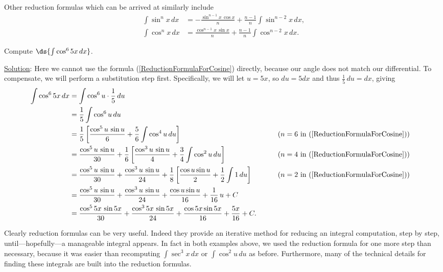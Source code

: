 Other reduction formulas which can be arrived at similarly
include
\begin{align}
\int\sin^nx\,dx&=-\frac{\sin^{n-1}x\,\cos x}{n}
       +\frac{n-1}n\int\sin^{n-2}x\,dx,
        \label{ReductionFormulaForSine}\\
\int\cos^nx\,dx&=\frac{\cos^{n-1}x\,\sin x}{n}
       +\frac{n-1}n\int\cos^{n-2}x\,dx.
        \label{ReductionFormulaForCosine}
\end{align}

\bex Compute $\ds{\int\cos^65x\,dx}$.

\underline{Solution}: Here we cannot use the formula
(\ref{ReductionFormulaForCosine}) directly, because our angle does
not match our differential.  To compensate, we will
perform a substitution step first.  Specifically, we will
let $u=5x$, so $du=5dx$ and thus $\frac15\,du=dx$, giving
\begin{alignat*}{2}
\int\cos^65x\,dx&=\int\cos^6u\cdot\frac15\,du\\
&=\frac15\int\cos^6u\,du\\
&=\frac15\left[\frac{\cos^5u\,\sin u}6+\frac56\int\cos^4u\,du\right]
        &\qquad&\text{($n=6$ in (\ref{ReductionFormulaForCosine}))}\\
&=\frac{\cos^5u\,\sin u}{30}+\frac16\left[\frac{\cos^3u\,\sin u}{4}
           +\frac34\int\cos^2u\,du\right]
          &&\text{($n=4$ in (\ref{ReductionFormulaForCosine}))}\\
&=\frac{\cos^5u\,\sin u}{30}+\frac{\cos^3u\,\sin u}{24}
           +\frac18\left[\frac{\cos u\sin u}2+\frac12\int 1\,du\right]
          &&\text{($n=2$ in (\ref{ReductionFormulaForCosine}))}\\
&=\frac{\cos^5u\,\sin u}{30}+\frac{\cos^3u\,\sin u}{24}
           +\frac{\cos u\sin u}{16}+\frac1{16}\,u+C\\
&=\frac{\cos^55x\,\sin5x}{30}+\frac{\cos^35x\,\sin 5x}{24}
           +\frac{\cos 5x\sin 5x}{16}+\frac{5x}{16}+C.
\end{alignat*}
\eex

Clearly reduction formulas can be very useful.  Indeed they 
provide an iterative method for reducing an integral computation,
step by step, until---hopefully---a manageable integral appears.
In fact in 
both examples above, we used the reduction formula for one more step
than necessary, because it was easier than 
recomputing $\int\sec^3x\,dx$ or $\int\cos^2u\,du$ as before.
Furthermore, many of the technical details for finding these
integrals are built into the reduction formulas.


